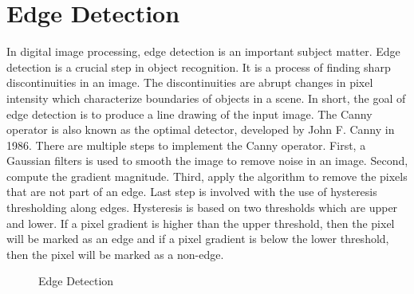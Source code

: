 \section{Edge Detection}
In digital image processing, edge detection is an important subject matter. Edge detection is a crucial step in object recognition. It is a process of finding sharp discontinuities in an image. The discontinuities are abrupt changes in pixel intensity which characterize boundaries of objects in a scene. In short, the goal of edge detection is to produce a line drawing of the input image.
The Canny operator is also known as the optimal detector, developed by John F. Canny in 1986.  There are multiple steps to implement the Canny operator. First, a Gaussian filters is used to smooth the image to remove noise in an image. Second, compute the gradient magnitude. Third, apply the algorithm to remove the pixels that are not part of an edge. Last step is involved with the use of hysteresis thresholding along edges. Hysteresis is based on two thresholds which are upper and lower. If a pixel gradient is higher than the upper threshold, then the pixel will be marked as an edge and if a pixel gradient is below the lower threshold, then the pixel will be marked as a non-edge.

\begin{figure}[H]
\centering
{}
\caption {Edge Detection}
\label {fig:EdgeDetection}
\end{figure}

